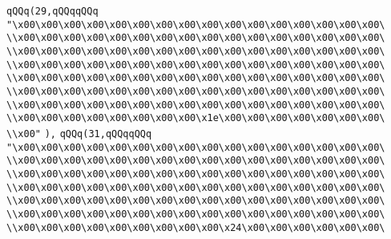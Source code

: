 \verb|qQQq(29,qQQqqQQq|\newline
\verb|"\x00\x00\x00\x00\x00\x00\x00\x00\x00\x00\x00\x00\x00\x00\x00\x00\|\newline
\verb|\\x00\x00\x00\x00\x00\x00\x00\x00\x00\x00\x00\x00\x00\x00\x00\x00\|\newline
\verb|\\x00\x00\x00\x00\x00\x00\x00\x00\x00\x00\x00\x00\x00\x00\x00\x00\|\newline
\verb|\\x00\x00\x00\x00\x00\x00\x00\x00\x00\x00\x00\x00\x00\x00\x00\x00\|\newline
\verb|\\x00\x00\x00\x00\x00\x00\x00\x00\x00\x00\x00\x00\x00\x00\x00\x00\|\newline
\verb|\\x00\x00\x00\x00\x00\x00\x00\x00\x00\x00\x00\x00\x00\x00\x00\x00\|\newline
\verb|\\x00\x00\x00\x00\x00\x00\x00\x00\x00\x00\x00\x00\x00\x00\x00\x00\|\newline
\verb|\\x00\x00\x00\x00\x00\x00\x00\x00\x1e\x00\x00\x00\x00\x00\x00\x00\|\newline
\verb|\\x00"|\newline
\verb|),|\newline
\verb|qQQq(31,qQQqqQQq|\newline
\verb|"\x00\x00\x00\x00\x00\x00\x00\x00\x00\x00\x00\x00\x00\x00\x00\x00\|\newline
\verb|\\x00\x00\x00\x00\x00\x00\x00\x00\x00\x00\x00\x00\x00\x00\x00\x00\|\newline
\verb|\\x00\x00\x00\x00\x00\x00\x00\x00\x00\x00\x00\x00\x00\x00\x00\x00\|\newline
\verb|\\x00\x00\x00\x00\x00\x00\x00\x00\x00\x00\x00\x00\x00\x00\x00\x00\|\newline
\verb|\\x00\x00\x00\x00\x00\x00\x00\x00\x00\x00\x00\x00\x00\x00\x00\x00\|\newline
\verb|\\x00\x00\x00\x00\x00\x00\x00\x00\x00\x00\x00\x00\x00\x00\x00\x00\|\newline
\verb|\\x00\x00\x00\x00\x00\x00\x00\x00\x00\x24\x00\x00\x00\x00\x00\x00\|\newline
